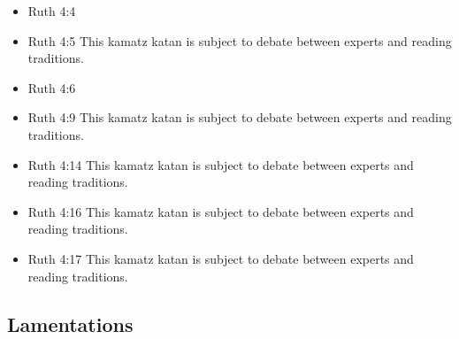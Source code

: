\documentclass[14pt]{book}
\begin{document}
\begin{multicols}{2}
\begin{itemize}
	\item Ruth 4:4
	
	\item Ruth 4:5 This kamatz katan is subject to debate between experts and reading traditions.
	
	\item Ruth 4:6
	
	\item Ruth 4:9 This kamatz katan is subject to debate between experts and reading traditions.
	
	\item Ruth 4:14 This kamatz katan is subject to debate between experts and reading traditions.
	
	\item Ruth 4:16 This kamatz katan is subject to debate between experts and reading traditions.
	
	\item Ruth 4:17 This kamatz katan is subject to debate between experts and reading traditions.
	
\end{itemize}\end{multicols}

\subsection{Lamentations}
\end{document}
